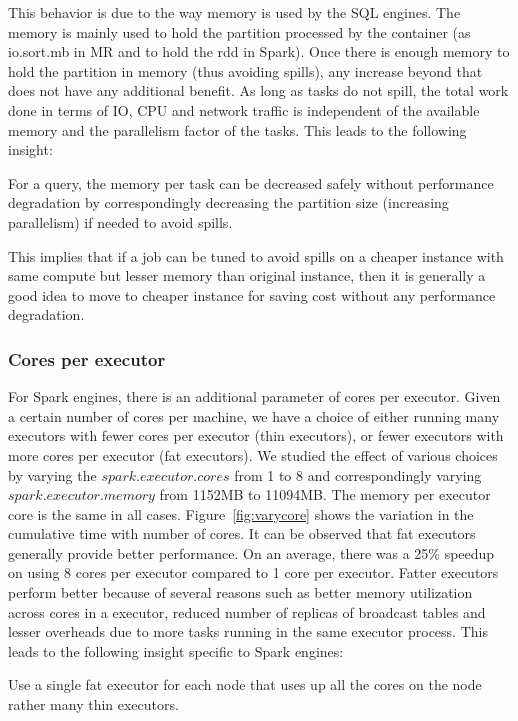 This behavior is due to the way memory is used by the SQL engines. The memory is mainly used to hold the partition processed by the container (as io.sort.mb in MR and to hold the rdd in Spark). Once there is enough memory to hold the partition in memory (thus avoiding spills), any increase beyond that does not have any additional benefit.
As long as tasks do not spill, the total work done in terms of IO, CPU and network traffic is independent of the available memory and the parallelism factor of the tasks. This leads to the following insight:
\begin{insight}
	\label{insight:mem}
	For a query, the memory per task can be decreased safely without performance degradation by correspondingly decreasing the partition size (increasing parallelism) if needed to avoid spills.
\end{insight}
This implies that 
if a job can be tuned to avoid spills on a cheaper instance with same compute but lesser memory than original instance, then it is generally a good idea to move to cheaper instance for saving cost without any performance degradation.

\subsubsection*{Cores per executor}
For Spark engines, there is an additional parameter of cores per executor. Given a certain number of cores per machine, we have a choice of either running many executors with fewer cores per executor (thin executors), or fewer executors with more cores per executor (fat executors). We studied the effect of various choices by varying the $spark.executor.cores$ from 1 to 8 and correspondingly varying $spark.executor.memory$ from 1152MB to 11094MB. The memory per executor core is the same in all cases. Figure~\ref{fig:varycore} shows the variation in the cumulative time with number of cores. It can be observed that fat executors generally provide better performance. On an average, there was a 25\% speedup on using 8 cores per executor compared to 1 core per executor. Fatter executors perform better because of several reasons such as  better memory utilization across cores in a executor, reduced number of replicas of broadcast tables and lesser overheads due to more tasks running in the same executor process. This leads to the following insight specific to Spark engines:
\begin{insight}
	\label{insight:executorcore}
	Use a single fat executor for each node that uses up all the cores on the node rather many thin executors.
\end{insight}

